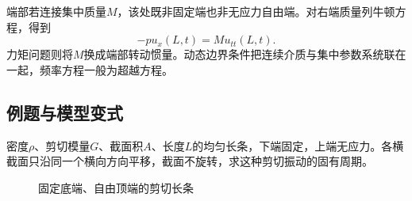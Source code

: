 端部若连接集中质量$M$，该处既非固定端也非无应力自由端。对右端质量列牛顿方程，得到
\[
 -p u_x(L,t)=M u_{tt}(L,t).
\]
力矩问题则将$M$换成端部转动惯量。动态边界条件把连续介质与集中参数系统联在一起，频率方程一般为超越方程。


\subsection{例题与模型变式}

\begin{example}[固定底端长条的剪切驻波]\label{ex:hw7-1}

密度$\rho$、剪切模量$G$、截面积$A$、长度$L$的均匀长条，下端固定，上端无应力。各横截面只沿同一个横向方向平移，截面不旋转，求这种剪切振动的固有周期。

\end{example}


\begin{figure}[H]\centering
{}
\caption{固定底端、自由顶端的剪切长条}\label{fig:hw7-1-q}
\end{figure}

